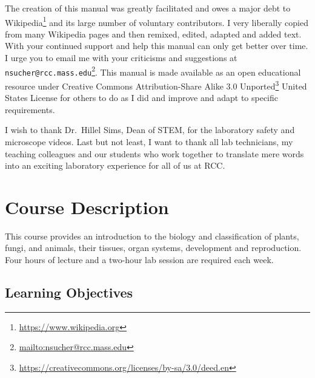 \documentclass[]{book}
\let\rmarkdownfootnote\footnote%
\def\footnote{\protect\rmarkdownfootnote}
\renewcommand{\href}[2]{#2\footnote{\url{#1}}}
\theoremstyle{definition}
\theoremstyle{definition}
\theoremstyle{definition}
\theoremstyle{remark}
\begin{document}
The creation of this manual was greatly facilitated and owes a major
debt to \href{https://www.wikipedia.org}{Wikipedia} and its large number of voluntary contributors. I very
liberally copied from many Wikipedia pages and then remixed, edited,
adapted and added text. With your continued support and help this manual
can only get better over time. I urge you to email me with your
criticisms and suggestions at
\href{mailto:nsucher@rcc.mass.edu}{\nolinkurl{nsucher@rcc.mass.edu}}.
This manual is made available as an open educational resource under
\href{https://creativecommons.org/licenses/by-sa/3.0/deed.en}{Creative
Commons Attribution-Share Alike 3.0 Unported} United States License for
others to do as I did and improve and adapt to specific requirements.

I wish to thank Dr.~Hillel Sims, Dean of STEM, for the laboratory safety
and microscope videos. Last but not least, I want to thank all lab
technicians, my teaching colleagues and our students who work together
to translate mere words into an exciting laboratory experience for all
of us at RCC.

\chapter{Course Description}\label{course-description}

This course provides an introduction to the biology and classification
of plants, fungi, and animals, their tissues, organ systems, development
and reproduction. Four hours of lecture and a two-hour lab session are
required each week.

\section{Learning Objectives}\label{learning-objectives}
\end{document}
